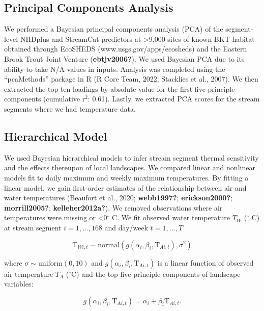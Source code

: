 \documentclass[
  11pt,
]{article}
\begin{document}
\hypertarget{principal-components-analysis}{%
\subsection{Principal Components Analysis}\label{principal-components-analysis}}

We performed a Bayesian principal components analysis (PCA) of the segment-level NHDplus and StreamCat predictors at \textgreater9,000 sites of known BKT habitat obtained through EcoSHEDS (www.usgs.gov/apps/ecosheds) and the Eastern Brook Trout Joint Venture (\textbf{ebtjv2006?}). We used Bayesian PCA due to its ability to take N/A values in inputs. Analysis was completed using the ``pcaMethods'' package in R (R Core Team, 2022; Stacklies et al., 2007). We then extracted the top ten loadings by absolute value for the first five principle components (cumulative r\(^2\): 0.61). Lastly, we extracted PCA scores for the stream segments where we had temperature data.

\hypertarget{hierarchical-model}{%
\subsection{Hierarchical Model}\label{hierarchical-model}}

We used Bayesian hierarchical models to infer stream segment thermal sensitivity and the effects thereupon of local landscapes. We compared linear and nonlinear models fit to daily maximum and weekly maximum temperatures. By fitting a linear model, we gain first-order estimates of the relationship between air and water temperatures (Beaufort et al., 2020; \textbf{webb1997?}; \textbf{erickson2000?}; \textbf{morrill2005?}; \textbf{kelleher2012a?}). We removed observations where air temperatures were missing or \textless0\(^\circ\) C. We fit observed water temperature \(T_W\) (\(^\circ\) C) at stream segment \(i = 1,...,168\) and day/week \(t = 1,...,T\)

\begin{equation}
  \text{T}_{Wi,t} \sim \text{normal}(g(\alpha_i, \beta_i, \text{T}_{Ai,t}), \sigma^2)
  \label{eq:Observation}
\end{equation}

where \(\sigma \sim \text{uniform}(0,10)\) and \(g(\alpha_i, \beta_i, \text{T}_{Ai,t})\) is a linear function of observed air temperature \(T_A\) (\(^\circ\)C) and the top five principle components of landscape variables:

\begin{equation}
  g(\alpha_i, \beta_i, \text{T}_{Ai,t}) = \alpha_i + \beta_i\text{T}_{Ai,t}.
  \label{eq:Linear}
\end{equation}
\end{document}
